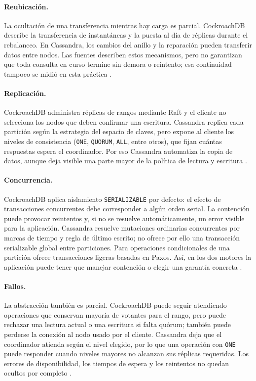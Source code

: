 \documentclass[11pt,a4paper]{article}
\begin{document}
\paragraph{Reubicación.} La ocultación de una transferencia mientras hay carga es parcial. CockroachDB describe la transferencia de instantáneas y la puesta al día de réplicas durante el rebalanceo. En Cassandra, los cambios del anillo y la reparación pueden transferir datos entre nodos. Las fuentes describen estos mecanismos, pero no garantizan que toda consulta en curso termine sin demora o reintento; esa continuidad tampoco se midió en esta práctica \cite{cockroachlabsReplication,apacheCassandraDynamo,apacheCassandraRepair}.

\paragraph{Replicación.} CockroachDB administra réplicas de rangos mediante Raft y el cliente no selecciona los nodos que deben confirmar una escritura. Cassandra replica cada partición según la estrategia del espacio de claves, pero expone al cliente los niveles de consistencia (\texttt{ONE}, \texttt{QUORUM}, \texttt{ALL}, entre otros), que fijan cuántas respuestas espera el coordinador. Por eso Cassandra automatiza la copia de datos, aunque deja visible una parte mayor de la política de lectura y escritura \cite{cockroachlabsReplication,apacheCassandraDynamo}.

\paragraph{Concurrencia.} CockroachDB aplica aislamiento \texttt{SERIALIZABLE} por defecto: el efecto de transacciones concurrentes debe corresponder a algún orden serial. La contención puede provocar reintentos y, si no se resuelve automáticamente, un error visible para la aplicación. Cassandra resuelve mutaciones ordinarias concurrentes por marcas de tiempo y regla de último escrito; no ofrece por ello una transacción serializable global entre particiones. Para operaciones condicionales de una partición ofrece transacciones ligeras basadas en Paxos. Así, en los dos motores la aplicación puede tener que manejar contención o elegir una garantía concreta \cite{cockroachlabsDeveloperBasics,apacheCassandraDynamo,apacheCassandraGuarantees}.

\paragraph{Fallos.} La abstracción también es parcial. CockroachDB puede seguir atendiendo operaciones que conservan mayoría de votantes para el rango, pero puede rechazar una lectura actual o una escritura si falta quórum; también puede perderse la conexión al nodo usado por el cliente. Cassandra deja que el coordinador atienda según el nivel elegido, por lo que una operación con \texttt{ONE} puede responder cuando niveles mayores no alcanzan sus réplicas requeridas. Los errores de disponibilidad, los tiempos de espera y los reintentos no quedan ocultos por completo \cite{cockroachlabsReplication,apacheCassandraDynamo}.
\end{document}
